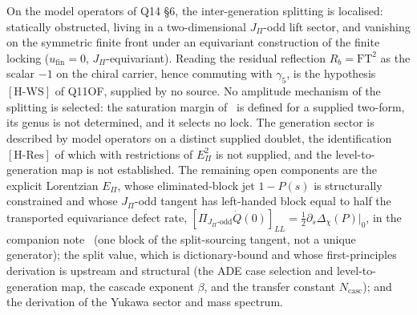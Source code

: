 \documentclass[11pt,a4paper]{article}
\theoremstyle{definition}
\newcommand{\Epi}{E_\Pi}
\newcommand{\HRes}{\ensuremath{[\mathrm{H\text{-}Res}]}}
\newcommand{\HWS}{\ensuremath{[\mathrm{H\text{-}WS}]}}
\begin{document}
    On the model operators of Q14 \S6, the inter-generation splitting is localised: statically obstructed, living in a
    two-dimensional $J_\Pi$-odd lift sector, and vanishing on the symmetric finite front under an equivariant
    construction of the finite locking ($u_{\mathrm{fin}}=0$, $J_\Pi$-equivariant).
    Reading the residual reflection $R_b=\mathrm{FT}^2$ as the scalar $-1$ on the chiral carrier, hence commuting
    with $\gamma_5$, is the hypothesis \HWS{} of Q11OF, supplied by no source.
    No amplitude mechanism of the splitting is selected: the saturation margin of~\cite{Beau2026bim} is defined for a
    supplied two-form, its genus is not determined, and it selects no lock.
    The generation sector is described by model operators on a distinct supplied doublet, the identification \HRes{}
    of which with restrictions of $\Epi^2$ is not supplied, and the level-to-generation map is not established.
    The remaining open components are the explicit Lorentzian $\Epi$, whose eliminated-block jet $1-P(s)$ is
    structurally constrained and whose $J_\Pi$-odd tangent has left-handed block equal to half the transported
    equivariance defect rate, $[\Pi_{J_\Pi\text{-odd}}\dot Q(0)]_{LL}=\tfrac12\partial_s\Delta_\chi(P)|_0$, in the
    companion
    note~\cite{Beau2026ebj} (one block of the split-sourcing tangent, not a unique generator); the split value, which is
    dictionary-bound and whose first-principles derivation is upstream and structural (the ADE case selection and
    level-to-generation map, the cascade exponent $\beta$, and the transfer constant $N_{\mathrm{casc}}$); and the
    derivation of the Yukawa sector and mass spectrum.
\end{document}
